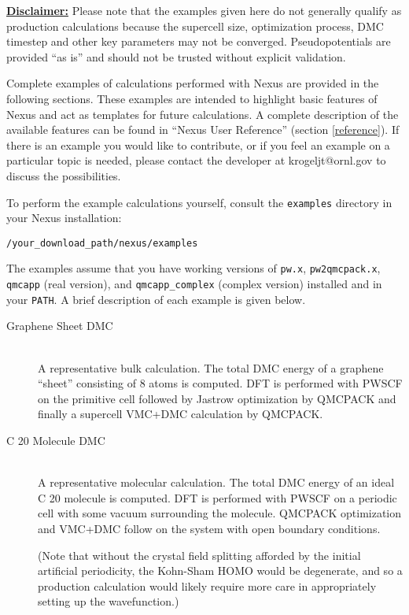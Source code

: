 \documentclass[oneside,11pt]{memoir}
\numberwithin{equation}{section}
\newcommand{\bu}[1]{\textbf{\underline{#1}}}
\begin{document}
\bu{Disclaimer:} Please note that the examples given here do not generally qualify as production 
calculations because the supercell size, optimization process, DMC timestep and 
other key parameters may not be converged.  Pseudopotentials are provided 
``as is'' and should not be trusted without explicit validation.

Complete examples of calculations performed with Nexus are provided 
in the following sections.  These examples are intended to highlight basic 
features of Nexus and act as templates for future calculations.  
A complete description of the available features can be found in ``Nexus 
User Reference'' (section \ref{reference}).  If there is an example you 
would like to contribute, or if you feel an example on a particular topic is 
needed, please contact the developer at krogeljt@ornl.gov to discuss the 
possibilities.  

To perform the example calculations yourself, consult the \texttt{examples} 
directory in your Nexus installation:
\begin{shaded}
\begin{verbatim}
/your_download_path/nexus/examples
\end{verbatim}
\end{shaded}
The examples assume that you have working versions of \texttt{pw.x}, 
\texttt{pw2qmcpack.x}, \texttt{qmcapp} (real version), and 
\texttt{qmcapp\_complex} (complex version) installed and in your \texttt{PATH}. 
A brief description of each example is given below.  

\begin{description}
  \item[Graphene Sheet DMC] \hfill \\
    A representative bulk calculation.  The total DMC energy of a graphene 
    ``sheet'' consisting of 8 atoms is computed.  DFT is performed with 
    PWSCF on the primitive cell followed by Jastrow optimization by QMCPACK 
    and finally a supercell VMC+DMC calculation by QMCPACK.  

  \item[C 20 Molecule DMC] \hfill  \\
    A representative molecular calculation.  The total DMC energy of an ideal 
    C 20 molecule is computed.  DFT is performed with PWSCF on a periodic cell 
    with some vacuum surrounding the molecule.  QMCPACK optimization and 
    VMC+DMC follow on the system with open boundary conditions.  

    (Note that without the crystal field splitting afforded by the initial 
    artificial periodicity, the Kohn-Sham HOMO would be degenerate, and so a 
    production calculation would likely require more care in appropriately 
    setting up the wavefunction.)
\end{description}
\end{document}
